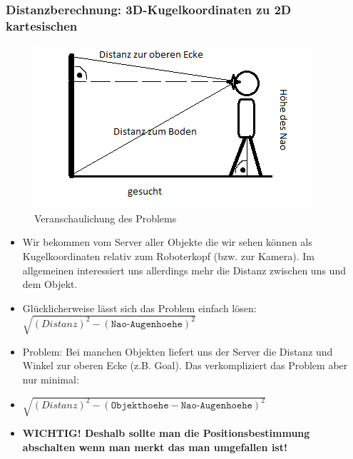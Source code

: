 \subsubsection*{Distanzberechnung: 3D-Kugelkoordinaten zu 2D kartesischen}
\begin{figure}[h]
\begin{center}
\includegraphics[scale=0.6]{Distanz_3D_Kugelkoordinaten_zu_2D_kartesisch}
\end{center}
\caption{Veranschaulichung des Problems}
\end{figure}
\begin{itemize}
\item Wir bekommen vom Server aller Objekte die wir sehen können als 
Kugelkoordinaten relativ zum Roboterkopf (bzw. zur Kamera). Im 
allgemeinen interessiert uns allerdings mehr die Distanz zwischen uns 
und dem Objekt. 
\item Glücklicherweise lässt sich das Problem einfach lösen: $\sqrt{(Distanz)^2 - (\texttt{Nao-Augenhoehe})^2}$
\item Problem: Bei manchen Objekten liefert uns der Server die Distanz
 und Winkel zur oberen Ecke (z.B. Goal). Das verkompliziert das Problem 
aber nur minimal:
\item $\sqrt{(Distanz)^2 - (\texttt{Objekthoehe} - \texttt{Nao-Augenhoehe})^2}$
\item \textbf{WICHTIG! Deshalb sollte man die Positionsbestimmung abschalten wenn man merkt das man umgefallen ist!}
\end{itemize}
